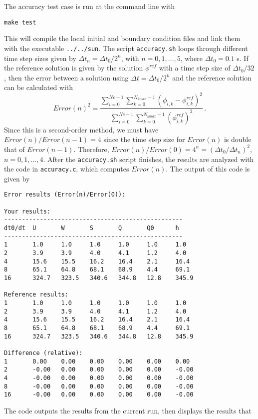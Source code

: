 \documentclass[12pt,oneside]{article}
\begin{document}
The accuracy test case is run at the command line with
\begin{verbatim}
make test
\end{verbatim}
This will compile the local initial and boundary condition files and link them with the
executable \verb+../../sun+.  The script \verb+accuracy.sh+ loops through different
time step sizes given by $\Delta t_n = \Delta t_0/2^n$, with $n=0,1,\dots,5$, where
$\Delta t_0 = 0.1$ s.  If the reference solution is given by the solution $\phi^{ref}$
with a time step size of $\Delta t_0/32$, then the error between a solution using
$\Delta t=\Delta t_0/2^n$ and the 
reference solution can be calculated with
\[
Error(n)^2 = \frac{\sum_{i=0}^{Nc-1}\sum_{k=0}^{N_{kmax}-1} \left(\phi_{i,k}-\phi^{ref}_{i,k}\right)^2}
{\sum_{i=0}^{Nc-1}\sum_{k=0}^{N_{kmax}-1} \left(\phi^{ref}_{i,k}\right)^2}\,.
\]
Since this is a second-order method, we must have $Error(n)/Error(n-1)=4$ since the time step size
for $Error(n)$ is double that of $Error(n-1)$.  Therefore, $Error(n)/Error(0) = 4^n = (\Delta t_0/\Delta t_n)^2$,
$n=0,1,\dots,4$.  After
the \verb+accuracy.sh+ script finishes, the results are analyzed with the code in \verb+accuracy.c+,
which computes $Error(n)$.  The output of this code is given by
\begin{verbatim}
Error results (Error(n)/Error(0)):

Your results:
--------------------------------------------------
dt0/dt  U       W       S       Q       Q0      h
--------------------------------------------------
1       1.0     1.0     1.0     1.0     1.0     1.0
2       3.9     3.9     4.0     4.1     1.2     4.0
4       15.6    15.5    16.2    16.4    2.1     16.4
8       65.1    64.8    68.1    68.9    4.4     69.1
16      324.7   323.5   340.6   344.8   12.8    345.9

Reference results:
1       1.0     1.0     1.0     1.0     1.0     1.0
2       3.9     3.9     4.0     4.1     1.2     4.0
4       15.6    15.5    16.2    16.4    2.1     16.4
8       65.1    64.8    68.1    68.9    4.4     69.1
16      324.7   323.5   340.6   344.8   12.8    345.9

Difference (relative):
1       0.00    0.00    0.00    0.00    0.00    0.00
2       -0.00   0.00    0.00    0.00    0.00    -0.00
4       -0.00   0.00    0.00    0.00    0.00    -0.00
8       -0.00   0.00    0.00    0.00    0.00    -0.00
16      -0.00   0.00    0.00    0.00    0.00    -0.00
\end{verbatim}
The code outputs the results from the current run, then displays the results that
\end{document}
